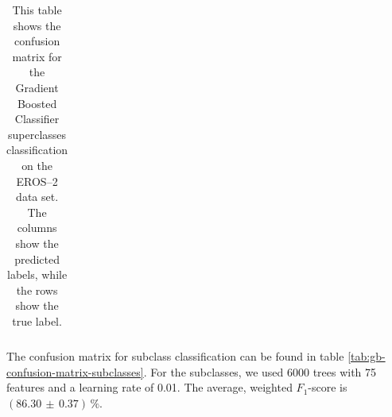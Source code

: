 \begin{table}[h]
{\begin{tabular}{c|ccccccccc|c}
\end{tabular}
}
\caption{This table shows the confusion matrix for the Gradient Boosted Classifier superclasses classification on the EROS--2 data set. The columns show the predicted labels, while the rows show the true label.}
\label{tab:gb-confusion-matrix-superclasses}
\end{table}

The confusion matrix for subclass classification can be found in table \ref{tab:gb-confusion-matrix-subclasses}. For the subclasses, we used 6000 trees with 75 features and a learning rate of 0.01. The average, weighted $F_1$-score is $(86.30 \, \pm \, 0.37) \, \%$.

\begin{landscape}
\begin{table}[h]
\centering
{}
\end{table}
\end{landscape}
